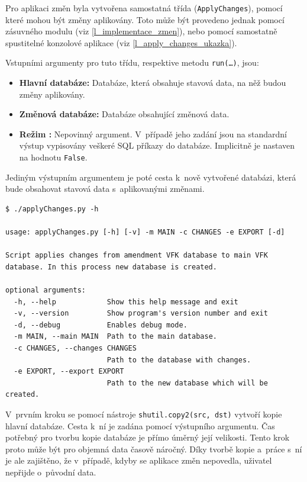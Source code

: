 \documentclass[a4paper,12pt,oneside]{book}
\begin{document}
Pro aplikaci změn byla vytvořena samostatná třída
(\texttt{ApplyChanges}), pomocí které mohou být změny aplikovány. Toto
může být provedeno jednak pomocí zásuvného modulu (viz
\ref{l_implementace_zmen}), nebo pomocí samostatně spustitelné
konzolové aplikace (viz \ref{l_apply_changes_ukazka}).

Vstupními argumenty pro tuto třídu, respektive metodu
\texttt{run(\dots)}, jsou:

\begin{itemize}
 \item \textbf{Hlavní databáze:} Databáze, která obsahuje stavová data, na něž budou změny aplikovány.
 \item \textbf{Změnová databáze:} Databáze obsahující změnová data.
 \item \textbf{Režim :} Nepovinný argument. V~případě jeho
   zadání jsou na standardní výstup vypisovány veškeré SQL příkazy do
   databáze. Implicitně je nastaven na hodnotu \texttt{False}.
\end{itemize}

Jediným výstupním argumentem je poté cesta k~nově vytvořené databázi, která bude obsahovat stavová data s~aplikovanými změnami.

\begin{lstlisting}[caption={Nápověda ke konzolové aplikaci pro implementaci změn}, 
		    label=l_apply_changes_ukazka]
$ ./applyChanges.py -h

usage: applyChanges.py [-h] [-v] -m MAIN -c CHANGES -e EXPORT [-d]

Script applies changes from amendment VFK database to main VFK database. In this process new database is created.

optional arguments:
  -h, --help            Show this help message and exit
  -v, --version         Show program's version number and exit
  -d, --debug           Enables debug mode.
  -m MAIN, --main MAIN  Path to the main database.
  -c CHANGES, --changes CHANGES
                        Path to the database with changes.
  -e EXPORT, --export EXPORT
                        Path to the new database which will be created.
\end{lstlisting}

V~prvním kroku se pomocí nástroje \texttt{shutil.copy2(src, dst)}
vytvoří kopie hlavní databáze. Cesta k~ní je zadána pomocí výstupního
argumentu. Čas potřebný pro tvorbu kopie databáze je přímo úměrný její
velikosti. Tento krok proto může být pro objemná data časově
náročný. Díky tvorbě kopie a~práce s~ní je ale zajištěno, že
v~případě, kdyby se aplikace změn nepovedla, uživatel nepřijde
o~původní data.
\end{document}
